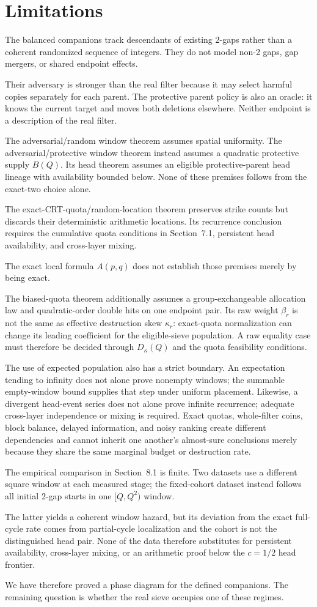 \section{Limitations}
The balanced companions track descendants of existing 2-gaps rather than a coherent randomized sequence of integers. They do not model non-2 gaps, gap mergers, or shared endpoint effects.

Their adversary is stronger than the real filter because it may select harmful copies separately for each parent. The protective parent policy is also an oracle: it knows the current target and moves both deletions elsewhere. Neither endpoint is a description of the real filter.

The adversarial/random window theorem assumes spatial uniformity. The adversarial/protective window theorem instead assumes a quadratic protective supply $B(Q)$. Its head theorem assumes an eligible protective-parent head lineage with availability bounded below. None of these premises follows from the exact-two choice alone.

The exact-CRT-quota/random-location theorem preserves strike counts but discards their deterministic arithmetic locations. Its recurrence conclusion requires the cumulative quota conditions in Section~7.1, persistent head availability, and cross-layer mixing.

The exact local formula $A(p,q)$ does not establish those premises merely by being exact.

The biased-quota theorem additionally assumes a group-exchangeable allocation law and quadratic-order double hits on one endpoint pair. Its raw weight $\beta_r$ is not the same as effective destruction skew $\kappa_r$: exact-quota normalization can change its leading coefficient for the eligible-sieve population. A raw equality case must therefore be decided through $D_{\kappa}(Q)$ and the quota feasibility conditions.

The use of expected population also has a strict boundary. An expectation tending to infinity does not alone prove nonempty windows; the summable empty-window bound supplies that step under uniform placement. Likewise, a divergent head-event series does not alone prove infinite recurrence; adequate cross-layer independence or mixing is required. Exact quotas, whole-filter coins, block balance, delayed information, and noisy ranking create different dependencies and cannot inherit one another's almost-sure conclusions merely because they share the same marginal budget or destruction rate.

The empirical comparison in Section~8.1 is finite. Two datasets use a different square window at each measured stage; the fixed-cohort dataset instead follows all initial 2-gap starts in one $[Q,Q^2)$ window.

The latter yields a coherent window hazard, but its deviation from the exact full-cycle rate comes from partial-cycle localization and the cohort is not the distinguished head pair. None of the data therefore substitutes for persistent availability, cross-layer mixing, or an arithmetic proof below the $c=1/2$ head frontier.

We have therefore proved a phase diagram for the defined companions. The remaining question is whether the real sieve occupies one of these regimes.
